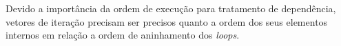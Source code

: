 Devido a importância da ordem de execução para tratamento de dependência,
vetores de iteração precisam ser precisos quanto a ordem dos seus elementos
internos em relação a ordem de aninhamento dos \textit{loops}. 










